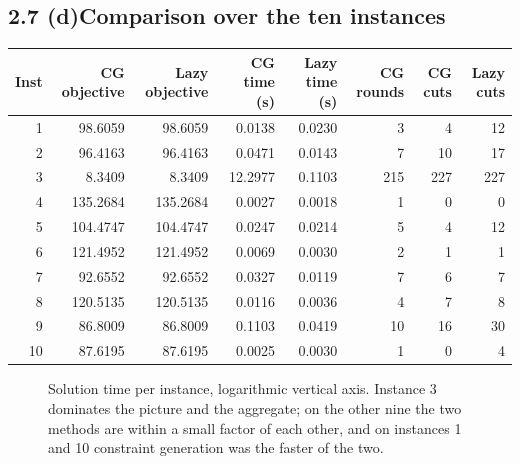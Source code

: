 \documentclass[11pt]{article}
\begin{document}
\subsection*{2.7 (d)\quad Comparison over the ten instances}

\begin{center}
\small
\begin{tabular}{@{}rrrrrrrr@{}}
\toprule
Inst & CG objective & Lazy objective & CG time (s) & Lazy time (s)
     & CG rounds & CG cuts & Lazy cuts \\
\midrule
1  &  98.6059 &  98.6059 &  0.0138 & 0.0230 &   3 &   4 &  12 \\
2  &  96.4163 &  96.4163 &  0.0471 & 0.0143 &   7 &  10 &  17 \\
3  &   8.3409 &   8.3409 & 12.2977 & 0.1103 & 215 & 227 & 227 \\
4  & 135.2684 & 135.2684 &  0.0027 & 0.0018 &   1 &   0 &   0 \\
5  & 104.4747 & 104.4747 &  0.0247 & 0.0214 &   5 &   4 &  12 \\
6  & 121.4952 & 121.4952 &  0.0069 & 0.0030 &   2 &   1 &   1 \\
7  &  92.6552 &  92.6552 &  0.0327 & 0.0119 &   7 &   6 &   7 \\
8  & 120.5135 & 120.5135 &  0.0116 & 0.0036 &   4 &   7 &   8 \\
9  &  86.8009 &  86.8009 &  0.1103 & 0.0419 &  10 &  16 &  30 \\
10 &  87.6195 &  87.6195 &  0.0025 & 0.0030 &   1 &   0 &   4 \\
\bottomrule
\end{tabular}
\end{center}

\begin{figure}[htbp]
\centering
{}
\caption{Solution time per instance, logarithmic vertical axis. Instance
3 dominates the picture and the aggregate; on the other nine the two
methods are within a small factor of each other, and on instances 1 and
10 constraint generation was the faster of the two.}
\end{figure}
\end{document}
